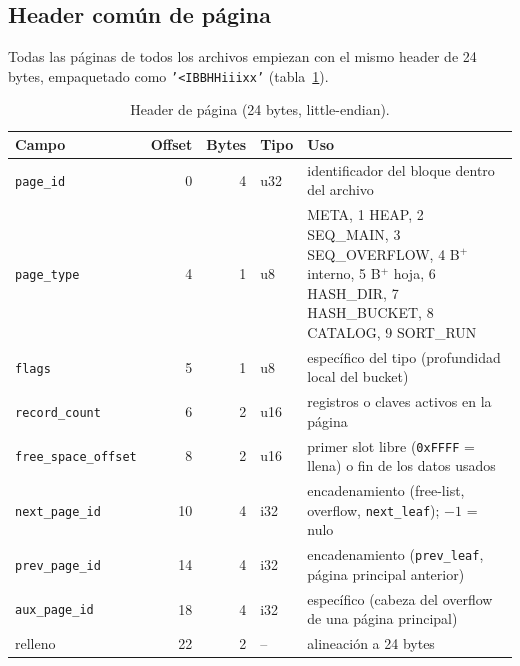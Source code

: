 \documentclass[11pt,a4paper]{article}
\newcommand{\code}[1]{\texttt{#1}}
\begin{document}
\subsection{Header común de página}

Todas las páginas de todos los archivos empiezan con el mismo header de 24 bytes, empaquetado como
\code{'<IBBHHiiixx'} (tabla~\ref{tab:header}).

\begin{table}[H]
\centering\small
\begin{tabular}{@{}lrrl>{\raggedright\arraybackslash}p{7.2cm}@{}}
\toprule
Campo & Offset & Bytes & Tipo & Uso \\
\midrule
\code{page\_id} & 0 & 4 & u32 & identificador del bloque dentro del archivo \\
\code{page\_type} & 4 & 1 & u8 & 0 META, 1 HEAP, 2 SEQ\_MAIN, 3 SEQ\_OVERFLOW, 4 B$^+$ interno, 5 B$^+$ hoja, 6 HASH\_DIR, 7 HASH\_BUCKET, 8 CATALOG, 9 SORT\_RUN \\
\code{flags} & 5 & 1 & u8 & específico del tipo (profundidad local del bucket) \\
\code{record\_count} & 6 & 2 & u16 & registros o claves activos en la página \\
\code{free\_space\_offset} & 8 & 2 & u16 & primer slot libre (\code{0xFFFF} = llena) o fin de los datos usados \\
\code{next\_page\_id} & 10 & 4 & i32 & encadenamiento (free-list, overflow, \code{next\_leaf}); $-1$ = nulo \\
\code{prev\_page\_id} & 14 & 4 & i32 & encadenamiento (\code{prev\_leaf}, página principal anterior) \\
\code{aux\_page\_id} & 18 & 4 & i32 & específico (cabeza del overflow de una página principal) \\
relleno & 22 & 2 & -- & alineación a 24 bytes \\
\bottomrule
\end{tabular}
\caption{Header de página (24 bytes, little-endian).}
\label{tab:header}
\end{table}
\end{document}
